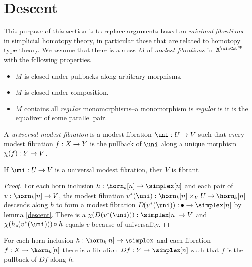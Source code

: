 \section{Descent} 
This purpose of this section is to replace arguments based on \emph{minimal fibrations} in simplicial homotopy theory, in particular those that are related to homotopy type theory. We assume that there is a class $M$ of \emph{modest fibrations} in $\ambient\s$ with the following properties.
\begin{itemize}
\item $M$ is closed under pullbacks along arbitrary morphisms.
\item $M$ is closed under composition.
\item $M$ contains all \emph{regular} monomorphisms--a monomorphism is \emph{regular} is it is the equalizer of some parallel pair.
\end{itemize} 

\newcommand\chm\chi
\begin{definition} A \emph{universal modest fibration} is a modest fibration $\uni\of U\to V$ such that every modest fibration $f: X\to Y$ is the pullback of $\uni$ along a unique morphism $\chm(f)\of Y\to V$.
\end{definition}


\begin{theorem} If $\uni\of U\to V$ is a universal modest fibration, then $V$ is fibrant.
\end{theorem}


\begin{proof} For each horn inclusion $h\of \horn_k[n]\to\simplex[n]$ and each pair of $v\of \horn_k[n]\to V$, the modest fibration $v\ri(\uni)\of \horn_k[n]\times_V U \to \horn_k[n]$ descends along $h$ to form a modest fibration $D(v\ri(\uni))\of \bullet\to\simplex[n]$ by lemma \ref{descent}. There is a $\chm(D(v\ri(\uni)))\of\simplex[n]\to V$ and $\chm(h_*(v\ri(\uni)))\circ h$ equals $v$ because of universality.
\end{proof}





\begin{lemma}[Descent]
For each horn inclusion $h\of \horn_k[n]\to\simplex$ and each fibration $f\of X\to \horn_k[n]$ there is a fibration $Df\of Y\to\simplex[n]$ such that $f$ is the pullback of $Df$ along $h$.
\label{descent}
\end{lemma}

